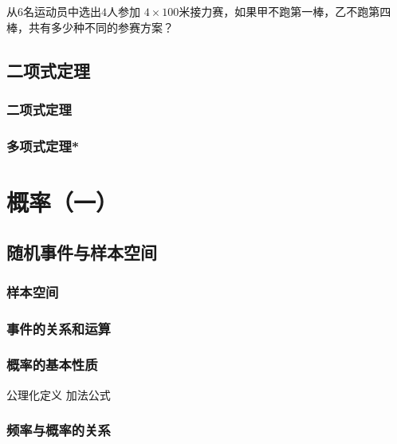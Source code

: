 \begin{homework}
    从\(6\)名运动员中选出\(4\)人参加 \(4\times 100\)米接力赛，如果甲不跑第一棒，乙不跑第四棒，共有多少种不同的参赛方案？
\end{homework}
\begin{homework}
    
\end{homework}
\begin{homework}
    
\end{homework}
\begin{homework}
    
\end{homework}




\clearpage


\section{二项式定理}
\subsection{二项式定理}
\clearpage
\subsection{多项式定理*}
\clearpage


\chapter{概率（一）}


\section{随机事件与样本空间}
\subsection{样本空间}
\clearpage
\subsection{事件的关系和运算}
\clearpage
\subsection{概率的基本性质}
公理化定义 加法公式
\clearpage
\subsection{频率与概率的关系}
\clearpage


